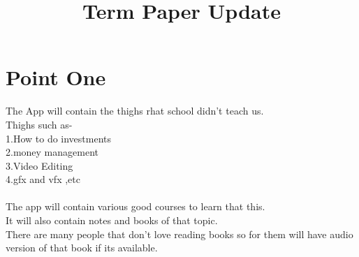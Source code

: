 \documentclass[12pt,letterpaper]{article}
\begin{document}
\title{Term Paper Update }
\maketitle

\section{Point One}
The App will contain the thighs rhat school didn't teach us.\\
Thighs such as-\\
1.How to do investments\\
2.money management\\
3.Video Editing\\
4.gfx and vfx ,etc\\ \\
The app will contain various good courses to learn that this.\\
It will also contain notes and books of that topic.\\
There are many people that don't love reading books so for them will have audio version  of that book if its available.
\end{document}
